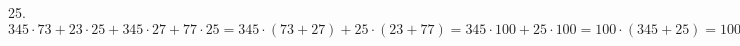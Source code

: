 25. $345\cdot73 + 23\cdot25 + 345\cdot27 + 77\cdot25=345\cdot(73+27)+25\cdot(23+77)=345\cdot100+25\cdot100=100\cdot(345+25)=100\cdot370=37000.$\\
